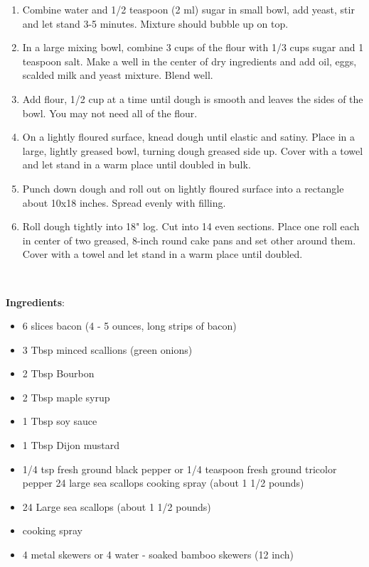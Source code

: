 \documentclass[11pt, twoside, openany]{book}
\begin{document}
\vspace{-3mm}\begin{enumerate}\setlength\itemsep{-1mm}
\item Combine water and 1/2 teaspoon (2 ml) sugar in small bowl, add yeast, stir and let stand 3-5 minutes. Mixture should bubble up on top.
\item In a large mixing bowl, combine 3 cups of the flour with 1/3 cups sugar and 1 teaspoon salt. Make a well in the center of dry ingredients and add oil, eggs, scalded milk and yeast mixture. Blend well.
\item Add flour, 1/2 cup at a time until dough is smooth and leaves the sides of the bowl. You may not need all of the flour.
\item On a lightly floured surface, knead dough until elastic and satiny. Place in a large, lightly greased bowl, turning dough greased side up. Cover with a towel and let stand in a warm place until doubled in bulk.
\item Punch down dough and roll out on lightly floured surface into a rectangle about 10x18 inches. Spread evenly with filling.
\item Roll dough tightly into 18" log. Cut into 14 even sections. Place one roll each in center of two greased, 8-inch round cake pans and set other around them. Cover with a towel and let stand in a warm place until doubled.
\end{enumerate}
 \label{bourbon-bacon-scallops}\hfill\textit{}\\
\begin{minipage}[t]{0.8\linewidth}
\textbf{Ingredients}:\vspace{-3mm}
\begin{multicols}{2}
\begin{itemize}\setlength\itemsep{-1mm}
\item 6 slices bacon (4 - 5 ounces, long strips of bacon)
\item 3 Tbsp minced scallions (green onions)
\item 2 Tbsp Bourbon
\item 2 Tbsp maple syrup
\item 1 Tbsp soy sauce
\item 1 Tbsp Dijon mustard
\item 1/4 tsp fresh ground black pepper or 1/4 teaspoon fresh ground tricolor pepper 24 large sea scallops cooking spray (about 1 1/2 pounds)
\item 24 Large sea scallops (about 1 1/2 pounds)
\item cooking spray
\item 4 metal skewers or 4 water - soaked bamboo skewers (12 inch)
\end{itemize}
\end{multicols}
\end{minipage}
\end{document}
